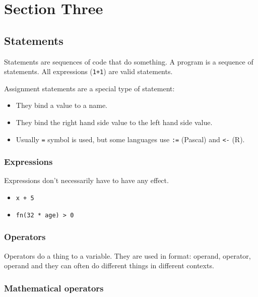 \section{Section Three}\label{sub:section_three}

\subsection{Statements}\label{ssub:statements}

Statements are sequences of code that do something.
A program is a sequence of statements.
All expressions (\texttt{1+1}) are valid statements.

Assignment statements are a special type of statement:

\begin{itemize}
    \item They bind a value to a name.
    \item They bind the right hand side value to the left hand side value.
    \item Usually \texttt{=} symbol is used, but some languages use \texttt{:=} (Pascal) and \texttt{<-} (R).
\end{itemize}

\subsubsection{Expressions}\label{ssub:expressions}

Expressions don't necessarily have to have any effect.

\begin{itemize}
    \item \texttt{x + 5}
    \item \texttt{fn(32 * age) > 0}
\end{itemize}

\subsubsection{Operators}\label{ssub:operators}

Operators do a thing to a variable.
They are used in format: operand, operator, operand and they can often do different things in different contexts.

\subsubsection{Mathematical operators}\label{ssub:mathematical-operators}

